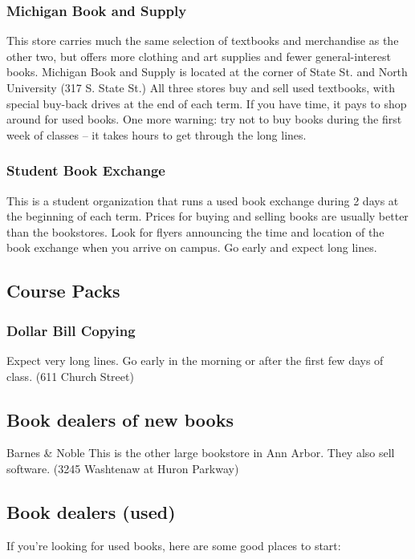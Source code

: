 \documentclass[11pt]{article}
\begin{document}
\subsubsection{Michigan Book and Supply}
\label{sec-8_2_3}

This store carries much the same selection of textbooks and merchandise as the other two, but offers more clothing and art supplies and fewer general-interest books. Michigan Book and Supply is located at the corner of State St. and North University (317 S. State St.)
All three stores buy and sell used textbooks, with special buy-back drives at the end of each term. If you have time, it pays to shop around for used books. One more warning: try not to buy books during the first week of classes – it takes hours to get through the long lines.
\subsubsection{Student Book Exchange}
\label{sec-8_2_4}

This is a student organization that runs a used book exchange during 2 days at the beginning of each term. Prices for buying and selling books are usually better than the bookstores. Look for flyers announcing the time and location of the book exchange when you arrive on campus. Go early and expect long lines.
\subsection{Course Packs}
\label{sec-8_3}
\subsubsection{Dollar Bill Copying}
\label{sec-8_3_1}

Expect very long lines. Go early in the morning or after the first few days of class. (611 Church Street)
\subsection{Book dealers of new books}
\label{sec-8_4}

Barnes \& Noble
This is the other large bookstore in Ann Arbor. They also sell
software. (3245 Washtenaw at Huron Parkway)
\subsection{Book dealers (used)}
\label{sec-8_5}

If you're looking for used books, here are some good places to start:
\end{document}

